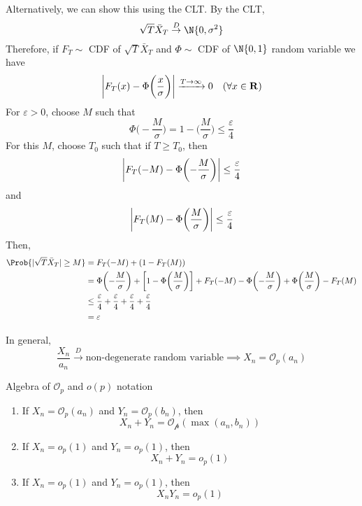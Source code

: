 \begin{Remark}{}{}
    Alternatively, we can show this using the CLT\@. By the CLT,
    \[ \sqrt{T}\bar{X}_T\stackrel{D}{\to}\N{0,\sigma^2} \]
    Therefore, if $ F_T\sim $ CDF of $ \sqrt{T}\bar{X}_T $ and $ \Phi\sim $
    CDF of $ \N{0,1} $ random variable we have
    \[ \abs*{F_T(x)-\Phi\biggl(\frac{x}{\sigma}\biggr)}\xrightarrow{T\to\infty}0\quad (\forall x\in\mathbf{R}) \]
    For $ \varepsilon>0 $, choose $ M $ such that
    \[ \Phi\biggl(-\frac{M}{\sigma}\biggr)=1-\biggl(\frac{M}{\sigma}\biggr)\le \frac{\varepsilon}{4} \]
    For this $ M $, choose $ T_0 $ such that if $ T\ge T_0 $, then
    \[ \abs*{F_T(-M)-\Phi\biggl(-\frac{M}{\sigma}\biggr)}\le \frac{\varepsilon}{4} \]
    and
    \[ \abs*{F_T(M)-\Phi\biggl(\frac{M}{\sigma}\biggr)}\le \frac{\varepsilon}{4} \]
    Then,
    \begin{align*}
        \Prob{\abs{\sqrt{T}\bar{X}_T}\ge M}
         & =F_T(-M)+(1-F_T(M))                                                                                                                                                            \\
         & =\Phi\biggl(-\frac{M}{\sigma}\biggr)+\biggl[1-\Phi\biggl(\frac{M}{\sigma} \biggr)\biggr]+F_T(-M)-\Phi\biggl(-\frac{M}{\sigma}\biggr)+\Phi\biggl(\frac{M}{\sigma}\biggr)-F_T(M) \\
         & \le \frac{\varepsilon}{4}+\frac{\varepsilon}{4} + \frac{\varepsilon}{4} + \frac{\varepsilon}{4}                                                                                \\
         & = \varepsilon
    \end{align*}
\end{Remark}
\begin{Remark}{}{}
    In general,
    \[ \frac{X_n}{a_n}\stackrel{D}{\to}\text{non-degenerate random variable}\implies X_n=\mathcal{O}_p(a_n)  \]
\end{Remark}
\begin{Remark}{Algebra of $ \mathcal{O}_p $ and $ o(p) $ notation}{}
    \begin{enumerate}
        \item If $ X_n=\mathcal{O}_p(a_n) $ and $ Y_n=\mathcal{O}_p(b_n) $, then
              \[ X_n+Y_n=\mathcal{O_p}(\max(a_n,b_n)) \]
        \item If $ X_n=o_p(1) $ and $ Y_n=o_p(1) $, then
              \[ X_n+Y_n=o_p(1) \]
        \item If $ X_n=o_p(1) $ and $ Y_n=o_p(1) $, then
              \[ X_n Y_n=o_p(1) \]
    \end{enumerate}
\end{Remark}
